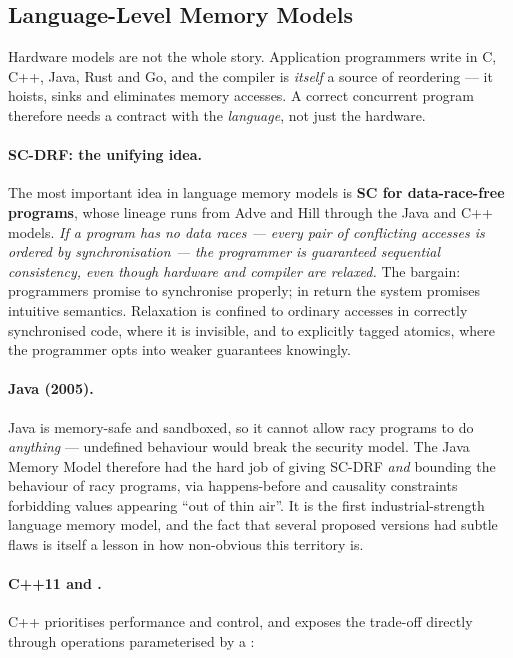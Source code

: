 \subsection{Language-Level Memory Models}

Hardware models are not the whole story.
Application programmers write in C, C++, Java, Rust and Go, and the compiler is
\emph{itself} a source of reordering --- it hoists, sinks and eliminates memory
accesses.
A correct concurrent program therefore needs a contract with the \emph{language},
not just the hardware.

\paragraph{SC-DRF: the unifying idea.}
The most important idea in language memory models is \textbf{SC for
data-race-free programs}, whose lineage runs from Adve and Hill
\cite{adve1990weak} through the Java and C++ models.
\emph{If a program has no data races --- every pair of conflicting accesses is
ordered by synchronisation --- the programmer is guaranteed sequential
consistency, even though hardware and compiler are relaxed.}
The bargain: programmers promise to synchronise properly; in return the system
promises intuitive semantics.
Relaxation is confined to ordinary accesses in correctly synchronised code,
where it is invisible, and to explicitly tagged atomics, where the programmer
opts into weaker guarantees knowingly.

\paragraph{Java (2005).}
Java is memory-safe and sandboxed, so it cannot allow racy programs to do
\emph{anything} --- undefined behaviour would break the security model.
The Java Memory Model \cite{manson2005java} therefore had the hard job of giving
SC-DRF \emph{and} bounding the behaviour of racy programs, via happens-before
and causality constraints forbidding values appearing ``out of thin air''.
It is the first industrial-strength language memory model, and the fact that
several proposed versions had subtle flaws is itself a lesson in how non-obvious
this territory is.

\paragraph{C++11 and .}
C++ prioritises performance and control, and exposes the trade-off directly
through  operations parameterised by a 
\cite{boehm2008foundations}:

